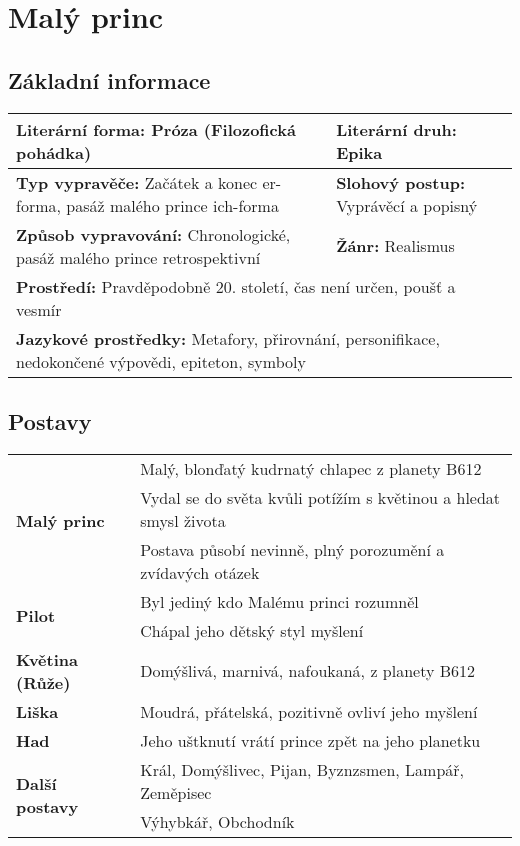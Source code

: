 \section{Malý princ}
\subsection*{Základní informace}
\begin{tabularx}{\linewidth}{l|l}
    \textbf{Literární forma:} Próza (Filozofická pohádka)                           & \textbf{Literární druh:} Epika               \\
    \hline
    \textbf{Typ vypravěče:} Začátek a konec er-forma, pasáž malého prince ich-forma & \textbf{Slohový postup:} Vyprávěcí a popisný \\
    \hline
    \textbf{Způsob vypravování:} Chronologické, pasáž malého prince retrospektivní  & \textbf{Žánr:} Realismus                     \\
    \hline
    \multicolumn{2}{l}{\textbf{Prostředí:} Pravděpodobně 20. století, čas není určen, poušť a vesmír}                              \\
    \hline
    \multicolumn{2}{l}{\textbf{Jazykové prostředky:} Metafory, přirovnání, personifikace, nedokončené výpovědi, epiteton, symboly} \\
\end{tabularx}
\subsection*{Postavy}
\begin{tabularx}{\linewidth}{l|l}
    \multirow{3}{15em}{\textbf{Malý princ}}    & Malý, blonďatý kudrnatý chlapec z planety B612                   \\
                                               & Vydal se do světa kvůli potížím s květinou a hledat smysl života \\
                                               & Postava působí nevinně, plný porozumění a zvídavých otázek       \\
    \hline
    \multirow{2}{15em}{\textbf{Pilot}}         & Byl jediný kdo Malému princi rozumněl                            \\
                                               & Chápal jeho dětský styl myšlení                                  \\
    \hline
    \textbf{Květina (Růže)}                    & Domýšlivá, marnivá, nafoukaná, z planety B612                    \\
    \hline
    \textbf{Liška}                             & Moudrá, přátelská, pozitivně ovliví jeho myšlení                 \\
    \hline
    \textbf{Had}                               & Jeho uštknutí vrátí prince zpět na jeho planetku                 \\
    \hline
    \multirow{2}{15em}{\textbf{Další postavy}} & Král, Domýšlivec, Pijan, Byznzsmen, Lampář, Zeměpisec            \\
                                               & Výhybkář, Obchodník
\end{tabularx}
